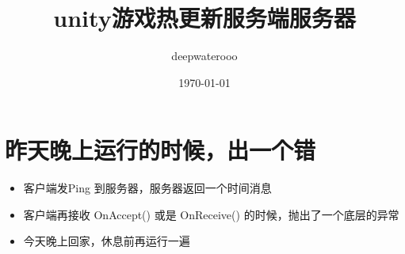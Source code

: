 \documentclass[9pt, b5paper]{article}
\author{deepwaterooo}
\date{\today}
\title{unity游戏热更新服务端服务器}
\begin{document}
\maketitle
\tableofcontents


\section{昨天晚上运行的时候，出一个错}
\label{sec-1}
\begin{itemize}
\item 客户端发Ping 到服务器，服务器返回一个时间消息
\item 客户端再接收 OnAccept() 或是 OnReceive() 的时候，抛出了一个底层的异常
\item 今天晚上回家，休息前再运行一遍
\end{itemize}
\end{document}
